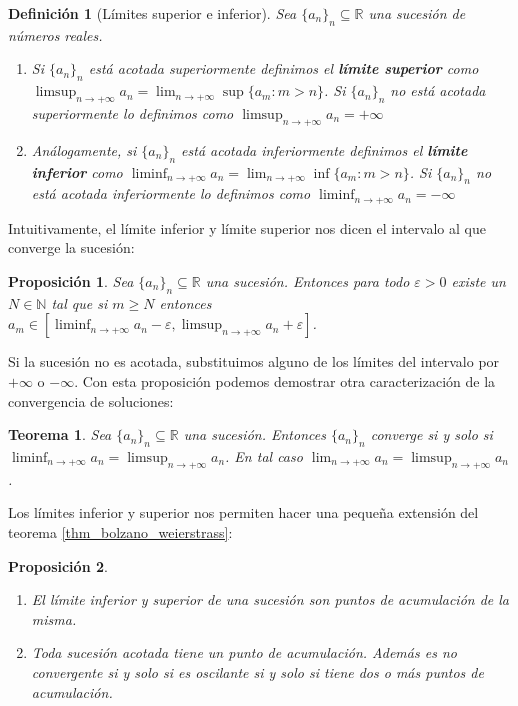 \documentclass{article}
\newtheorem{theorem}{Teorema}
\newtheorem{prop}{Proposición}
\newtheorem{define}{Definición}
\newcommand{\reales}{\mathbb{R}}
\newcommand{\naturales}{\mathbb{N}}
\newcommand{\sucesion}[1]{\{ #1 _n \}_n}
\newcommand{\sucreal}[1]{\{ #1 _n \}_n \subseteq \reales}
\newcommand{\limitesup}[1]{\limsup_{n\rightarrow +\infty} #1 _n}
\newcommand{\limiteinf}[1]{\liminf_{n\rightarrow +\infty} #1 _n}
\newcommand{\limiten}[1]{\lim_{n \rightarrow +\infty} #1}
\begin{document}
\begin{define}[Límites superior e inferior]
	Sea $\sucreal{a}$ una sucesión de números reales. 
	\begin{enumerate}
	\item
	Si $\sucesion{a}$ está acotada superiormente definimos el \textbf{límite superior} como $\limitesup{a} = \lim_{n \rightarrow +\infty} \sup\{ a_m : m > n\}$. Si $\sucesion{a}$ no está acotada superiormente lo definimos como $\limsup_{n\rightarrow +\infty} a_n = +\infty$
	\item
	Análogamente, si $\sucesion{a}$ está acotada inferiormente definimos el \textbf{límite inferior} como $\limiteinf{a} = \lim_{n \rightarrow +\infty} \inf\{ a_m : m > n\}$. Si $\sucesion{a}$ no está acotada inferiormente lo definimos como $\liminf_{n\rightarrow +\infty} a_n = -\infty$
	\end{enumerate}
\end{define}

Intuitivamente, el límite inferior y límite superior nos dicen el intervalo al que converge la sucesión:

\begin{prop}
	Sea $\sucreal{a}$ una sucesión. Entonces para todo $\varepsilon > 0$ existe un $N \in \naturales$ tal que si $m \geq N$ entonces $a_m \in [\limiteinf{a}-\varepsilon, \limitesup{a}+\varepsilon]$.
\end{prop}

Si la sucesión no es acotada, substituimos alguno de los límites del intervalo por $+\infty$ o $-\infty$.
Con esta proposición podemos demostrar otra caracterización de la convergencia de soluciones:

\begin{theorem}
	Sea $\sucreal{a}$ una sucesión. Entonces $\sucesion{a}$ converge si y solo si $\limiteinf{a} = \limitesup{a}$. En tal caso $\limiten{a_n} = \limitesup{a}$.
\end{theorem}

Los límites inferior y superior nos permiten hacer una pequeña extensión del teorema \eqref{thm_bolzano_weierstrass}:
\begin{prop}
\begin{enumerate}
\item
	El límite inferior y superior de una sucesión son puntos de acumulación de la misma.
\item
	Toda sucesión acotada tiene un punto de acumulación. Además es no convergente si y solo si es oscilante si y solo si tiene dos o más puntos de acumulación.
\end{enumerate}
\end{prop}
\end{document}
